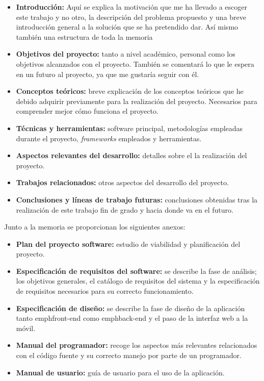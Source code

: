 \begin{itemize}
\tightlist
\item
  \textbf{Introducción:} Aquí se explica la motivación que me ha llevado a escoger este trabajo y no otro, la descripción del problema propuesto y una breve introducción general a la solución que se ha pretendido dar. Así mismo también una estructura de toda la memoria 
\item
  \textbf{Objetivos del proyecto:} tanto a nivel académico, personal como los objetivos alcanzados con el proyecto. También se comentará lo que le espera en un futuro al proyecto, ya que me gustaría seguir con él.
\item
  \textbf{Conceptos teóricos:} breve explicación de los conceptos
  teóricos que he debido adquirir previamente para la realización del proyecto. Necesarios para comprender mejor cómo funciona el proyecto.
\item
  \textbf{Técnicas y herramientas:} software principal, metodologías empleadas durante el proyecto, \emph{frameworks} empleados y herramientas.
\item
  \textbf{Aspectos relevantes del desarrollo:} detalles sobre el la realización del proyecto.
\item
  \textbf{Trabajos relacionados:} otros aspectos del desarrollo del proyecto.
\item
  \textbf{Conclusiones y líneas de trabajo futuras:} conclusiones
  obtenidas tras la realización de este trabajo fin de grado y hacia donde va en el futuro.
\end{itemize}

Junto a la memoria se proporcionan los siguientes anexos:

\begin{itemize}
\tightlist
\item
  \textbf{Plan del proyecto software:} estudio de viabilidad y planificación del proyecto.
\item
  \textbf{Especificación de requisitos del software:} se describe la
  fase de análisis; los objetivos generales, el catálogo de requisitos
  del sistema y la especificación de requisitos necesarios para su correcto funcionamiento.
\item
  \textbf{Especificación de diseño:} se describe la fase de diseño de la aplicación tanto emph{front-end} como emph{back-end} y el paso de la interfaz web a la móvil.
\item
  \textbf{Manual del programador:} recoge los aspectos más relevantes
  relacionados con el código fuente y su correcto manejo por parte de un programador.
\item
  \textbf{Manual de usuario:} guía de usuario para el uso de la aplicación.
\end{itemize}

